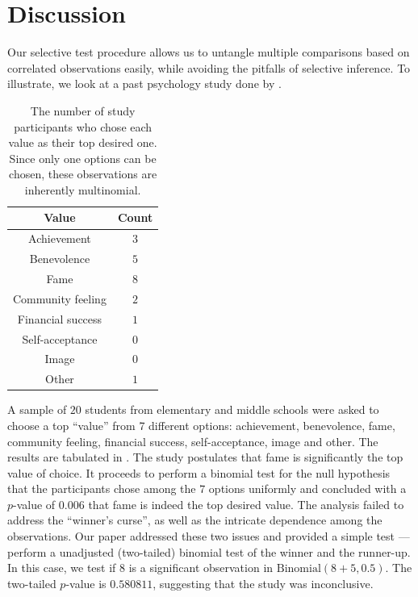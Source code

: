 \documentclass[11pt]{article}
\begin{document}
\section{Discussion}
\label{sec:disc}

Our selective test procedure allows us to untangle multiple comparisons based on correlated observations easily, while avoiding the pitfalls of selective inference. To illustrate, we look at a past psychology study done by \citet{Uhls:2012gf}.

\begin{table}[htbp]
\begin{center}
\begin{tabular}{c c}
	\hline
	Value & Count \\
	\hline
	Achievement & $3$ \\
	Benevolence & $5$ \\
	Fame & $8$ \\
	Community feeling & $2$ \\
	Financial success & $1$ \\
	Self-acceptance & $0$ \\
	Image & $0$ \\
	Other & $1$ \\
	\hline
\end{tabular}
\end{center}
\caption{The number of study participants who chose each value as their top desired one. Since only one options can be chosen, these observations are inherently multinomial.}
\label{tbl:fame}
\end{table}

A sample of $20$ students from elementary and middle schools were asked to choose a top ``value'' from 7 different options: achievement, benevolence, fame, community feeling, financial success, self-acceptance, image and other. The results are tabulated in . The study postulates that fame is significantly the top value of choice. It proceeds to perform a binomial test for the null hypothesis that the participants chose among the $7$ options uniformly and concluded with a $p$-value of $0.006$ that fame is indeed the top desired value. The analysis failed to address the ``winner's curse'', as well as the intricate dependence among the observations. Our paper addressed these two issues and provided a simple test --- perform a unadjusted (two-tailed) binomial test of the winner and the runner-up. In this case, we test if $8$ is a significant observation in $\text{Binomial}\left(8 + 5, 0.5\right)$. The two-tailed $p$-value is $0.580811$, suggesting that the study was inconclusive.



\end{document}
